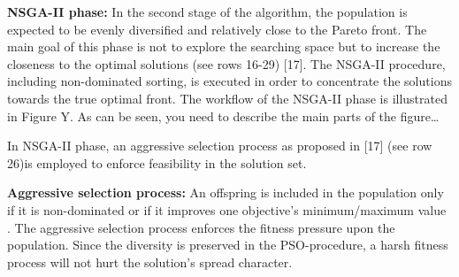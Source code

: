 \documentclass[10pt,journal,compsoc]{IEEEtran}
\begin{document}
\noindent\textbf{NSGA-II phase:}
In the second stage of the algorithm, the population is expected to be evenly diversified and relatively close to the Pareto front. The main goal of this phase is not to explore the searching space but to increase the closeness to the optimal solutions (see rows 16-29) [17]. The NSGA-II procedure, including non-dominated sorting, is executed in order to concentrate the solutions towards the true optimal front. The workflow of the NSGA-II phase is illustrated in Figure Y. As can be seen, you need to describe the main parts of the figure…

In NSGA-II phase, an aggressive selection process as proposed in [17] (see row 26)is employed to enforce feasibility in the solution set. 

\noindent\textbf{Aggressive selection process: }
An offspring is included in the population only if it is non-dominated or if it improves one objective’s minimum/maximum value . The aggressive selection process enforces the fitness pressure upon the population. Since the diversity is preserved in the PSO-procedure, a harsh fitness process will not hurt the solution’s spread character. 
\end{document}
